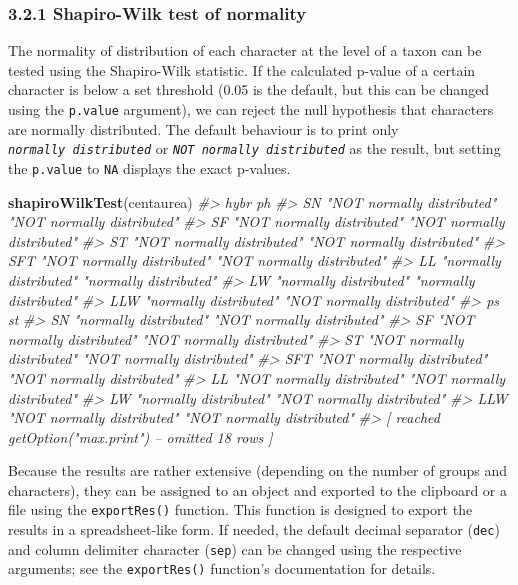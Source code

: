 \documentclass[
]{article}
\newenvironment{Shaded}{\begin{snugshade}}{\end{snugshade}}
\newcommand{\CommentTok}[1]{\textcolor[rgb]{0.56,0.35,0.01}{\textit{#1}}}
\newcommand{\KeywordTok}[1]{\textcolor[rgb]{0.13,0.29,0.53}{\textbf{#1}}}
\newcommand{\NormalTok}[1]{#1}
\begin{document}
\hypertarget{shapiro-wilk-test-of-normality}{%
\subsubsection{3.2.1 Shapiro-Wilk test of
normality}\label{shapiro-wilk-test-of-normality}}

The normality of distribution of each character at the level of a taxon
can be tested using the Shapiro-Wilk statistic. If the calculated
p-value of a certain character is below a set threshold (0.05 is the
default, but this can be changed using the \texttt{p.value} argument),
we can reject the null hypothesis that characters are normally
distributed. The default behaviour is to print only
\emph{\texttt{normally\ distributed}} or
\emph{\texttt{NOT\ normally\ distributed}} as the result, but setting
the \texttt{p.value} to \texttt{NA} displays the exact p-values.

\begin{Shaded}
\begin{Highlighting}[]
\KeywordTok{shapiroWilkTest}\NormalTok{(centaurea)}
\CommentTok{#>     hybr                       ph                        }
\CommentTok{#> SN  "NOT normally distributed" "NOT normally distributed"}
\CommentTok{#> SF  "NOT normally distributed" "NOT normally distributed"}
\CommentTok{#> ST  "NOT normally distributed" "NOT normally distributed"}
\CommentTok{#> SFT "NOT normally distributed" "NOT normally distributed"}
\CommentTok{#> LL  "normally distributed"     "normally distributed"    }
\CommentTok{#> LW  "normally distributed"     "normally distributed"    }
\CommentTok{#> LLW "normally distributed"     "NOT normally distributed"}
\CommentTok{#>     ps                         st                        }
\CommentTok{#> SN  "normally distributed"     "NOT normally distributed"}
\CommentTok{#> SF  "NOT normally distributed" "NOT normally distributed"}
\CommentTok{#> ST  "NOT normally distributed" "NOT normally distributed"}
\CommentTok{#> SFT "NOT normally distributed" "NOT normally distributed"}
\CommentTok{#> LL  "NOT normally distributed" "NOT normally distributed"}
\CommentTok{#> LW  "normally distributed"     "NOT normally distributed"}
\CommentTok{#> LLW "NOT normally distributed" "NOT normally distributed"}
\CommentTok{#>  [ reached getOption("max.print") -- omitted 18 rows ]}
\end{Highlighting}
\end{Shaded}

Because the results are rather extensive (depending on the number of
groups and characters), they can be assigned to an object and exported
to the clipboard or a file using the \texttt{exportRes()} function. This
function is designed to export the results in a spreadsheet-like form.
If needed, the default decimal separator (\texttt{dec}) and column
delimiter character (\texttt{sep}) can be changed using the respective
arguments; see the \texttt{exportRes()} function's documentation for
details.
\end{document}
